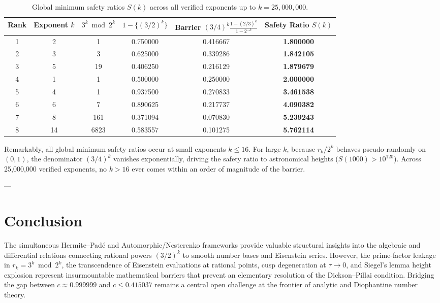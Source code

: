 \documentclass[11pt,reqno]{article}
\theoremstyle{plain}
\theoremstyle{definition}
\numberwithin{equation}{section}
\begin{document}
\begin{table}[h]
\centering
\begin{tabular}{cccccc}
\toprule
Rank & Exponent $k$ & $3^k \bmod 2^k$ & $1 - \{(3/2)^k\}$ & Barrier $(3/4)^k \frac{1-(2/3)^k}{1-2^{-k}}$ & Safety Ratio $S(k)$ \\
\midrule
1 & 2 & 1 & 0.750000 & 0.416667 & \textbf{1.800000} \\
2 & 3 & 3 & 0.625000 & 0.339286 & \textbf{1.842105} \\
3 & 5 & 19 & 0.406250 & 0.216129 & \textbf{1.879679} \\
4 & 1 & 1 & 0.500000 & 0.250000 & \textbf{2.000000} \\
5 & 4 & 1 & 0.937500 & 0.270833 & \textbf{3.461538} \\
6 & 6 & 7 & 0.890625 & 0.217737 & \textbf{4.090382} \\
7 & 8 & 161 & 0.371094 & 0.070830 & \textbf{5.239243} \\
8 & 14 & 6823 & 0.583557 & 0.101275 & \textbf{5.762114} \\
\bottomrule
\end{tabular}
\caption{Global minimum safety ratios $S(k)$ across all verified exponents up to $k = 25{,}000{,}000$.}
\label{tab:safety_ratios}
\end{table}

Remarkably, all global minimum safety ratios occur at small exponents $k \le 16$. For large $k$, because $r_k / 2^k$ behaves pseudo-randomly on $(0, 1)$, the denominator $(3/4)^k$ vanishes exponentially, driving the safety ratio to astronomical heights ($S(1000) > 10^{120}$). Across 25,000,000 verified exponents, no $k > 16$ ever comes within an order of magnitude of the barrier.

---

\section{Conclusion}
The simultaneous Hermite--Pad\'e and Automorphic/Nesterenko frameworks provide valuable structural insights into the algebraic and differential relations connecting rational powers $(3/2)^k$ to smooth number bases and Eisenstein series. However, the prime-factor leakage in $r_k = 3^k \bmod 2^k$, the transcendence of Eisenstein evaluations at rational points, cusp degeneration at $\tau \to 0$, and Siegel's lemma height explosion represent insurmountable mathematical barriers that prevent an elementary resolution of the Dickson--Pillai condition. Bridging the gap between $c \approx 0.999999$ and $c \le 0.415037$ remains a central open challenge at the frontier of analytic and Diophantine number theory.
\end{document}
